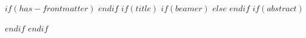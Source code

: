 $if(has-frontmatter)$
\frontmatter
$endif$
$if(title)$
$if(beamer)$
\frame{\titlepage}
$else$
$endif$
$if(abstract)$
\begin{abstract}
    $abstract$
\end{abstract}
$endif$
$endif$